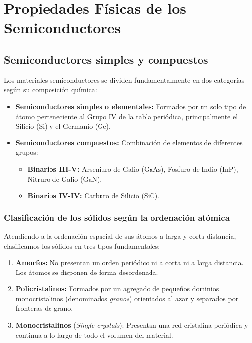 \chapter{Propiedades Físicas de los Semiconductores}

\section{Semiconductores simples y compuestos}

Los materiales semiconductores se dividen fundamentalmente en dos categorías según su composición química:

\begin{itemize}
    \item \textbf{Semiconductores simples o elementales:} Formados por un solo tipo de átomo perteneciente al Grupo IV de la tabla periódica, principalmente el Silicio ($\text{Si}$) y el Germanio ($\text{Ge}$).
    \item \textbf{Semiconductores compuestos:} Combinación de elementos de diferentes grupos:
    \begin{itemize}
        \item \textbf{Binarios III-V:} Arseniuro de Galio ($\text{GaAs}$), Fosfuro de Indio ($\text{InP}$), Nitruro de Galio ($\text{GaN}$).
        \item \textbf{Binarios IV-IV:} Carburo de Silicio ($\text{SiC}$).
    \end{itemize}
\end{itemize}

\subsection{Clasificación de los sólidos según la ordenación atómica}

Atendiendo a la ordenación espacial de sus átomos a larga y corta distancia, clasificamos los sólidos en tres tipos fundamentales:

\begin{enumerate}
    \item \textbf{Amorfos:} No presentan un orden periódico ni a corta ni a larga distancia. Los átomos se disponen de forma desordenada.
    \item \textbf{Policristalinos:} Formados por un agregado de pequeños dominios monocristalinos (denominados \textit{granos}) orientados al azar y separados por fronteras de grano.
    \item \textbf{Monocristalinos} (\textit{Single crystals}): Presentan una red cristalina periódica y continua a lo largo de todo el volumen del material.
\end{enumerate}

